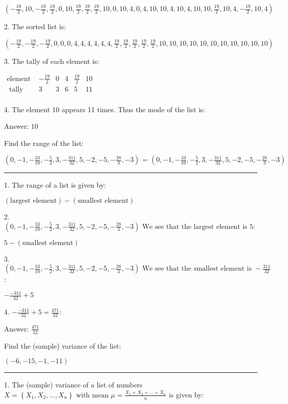 \documentclass{article}
\begin{document}
$\left(-\frac{19}{2},10,-\frac{19}{2},\frac{19}{2},0,10,\frac{19}{2},\frac{19}{2},\frac{19}{2},10,0,10,4,0,4,10,10,4,10,4,10,10,\frac{19}{2},10,4,-\frac{19}{2},10,4\right)$

2. The sorted list is:

$\left(-\frac{19}{2},-\frac{19}{2},-\frac{19}{2},0,0,0,4,4,4,4,4,4,\frac{19}{2},\frac{19}{2},\frac{19}{2},\frac{19}{2},\frac{19}{2},10,10,10,10,10,10,10,10,10,10,10\right)$

3. The tally of each element is:

$\begin{array}{cccccc}
\text{element }& -\frac{19}{2} & 0 & 4 & \frac{19}{2} & 10 \\
\text{ tally }& 3 & 3 & 6 & 5 & 11 \\
\end{array}$

4. The element 10 appears 11 times. Thus the mode of the list is:

Answer: $10$

\pagebreak

Find the range of the list:

$\left(0,-1,-\frac{33}{10},-\frac{5}{2},3,-\frac{311}{32},5,-2,-5,-\frac{28}{3},-3\right)\text{ = }\left(0,-1,-\frac{33}{10},-\frac{5}{2},3,-\frac{311}{32},5,-2,-5,-\frac{28}{3},-3\right)$

\hrule

1. The range of a list is given by:

$(\text{largest element})-(\text{smallest element})$

2. $\left(0,-1,-\frac{33}{10},-\frac{5}{2},3,-\frac{311}{32},5,-2,-5,-\frac{28}{3},-3\right)\text{  We see that the largest element is }5:$

$5-(\text{smallest element})$

3. $\left(0,-1,-\frac{33}{10},-\frac{5}{2},3,-\frac{311}{32},5,-2,-5,-\frac{28}{3},-3\right)\text{  We see that the smallest element is }-\frac{311}{32}$:

$-\frac{-311}{32}+5$

4. $-\frac{-311}{32}+5=\frac{471}{32}$:

Answer: $\frac{471}{32}$

\pagebreak

Find the (sample) variance of the list:

$(-6,-15,-1,-11)$

\hrule

1. The (sample) variance of a list of numbers $X=\left\{X_1,X_2,\ldots ,X_n\right\}\text{ with mean }\mu =\frac{X_1+X_2+\ldots +X_n}{n}$ is given by:
\end{document}
